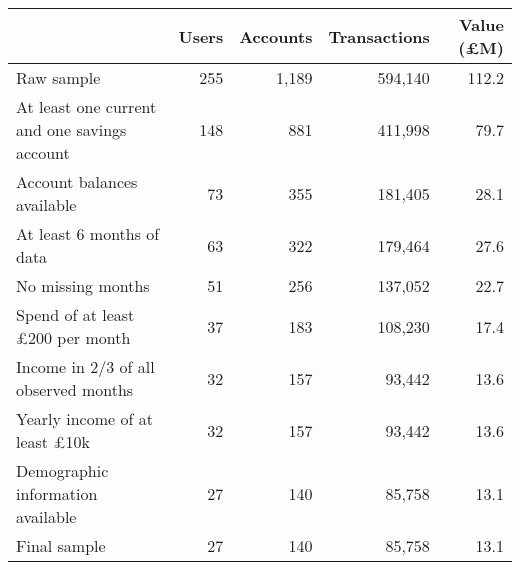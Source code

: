 \begin{tabular}{lrrrr}
\toprule
                                             & Users & Accounts & Transactions & Value (\pounds M) \\
\midrule
                                  Raw sample &   255 &    1,189 &      594,140 &             112.2 \\
At least one current and one savings account &   148 &      881 &      411,998 &              79.7 \\
                  Account balances available &    73 &      355 &      181,405 &              28.1 \\
                   At least 6 months of data &    63 &      322 &      179,464 &              27.6 \\
                           No missing months &    51 &      256 &      137,052 &              22.7 \\
            Spend of at least £200 per month &    37 &      183 &      108,230 &              17.4 \\
        Income in 2/3 of all observed months &    32 &      157 &       93,442 &              13.6 \\
        Yearly income of at least \pounds10k &    32 &      157 &       93,442 &              13.6 \\
           Demographic information available &    27 &      140 &       85,758 &              13.1 \\
                                Final sample &    27 &      140 &       85,758 &              13.1 \\
\bottomrule
\end{tabular}
